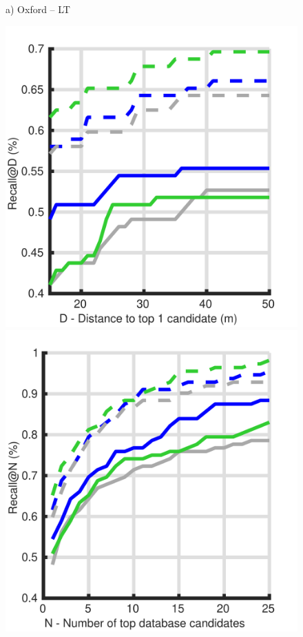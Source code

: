 \begin{figure}
\begin{minipage}{0.27\linewidth}
		a) Oxford -- LT
	\end{minipage}
	\begin{minipage}{0.27\linewidth}
		\center \scriptsize
		\includegraphics[width=\linewidth]{plot/depth_vs_ref/Results_snow_queries/distance}	
		
		\includegraphics[width=\linewidth]{plot/depth_vs_ref/Results_snow_queries/recall}
				

\end{minipage}
\end{figure}
